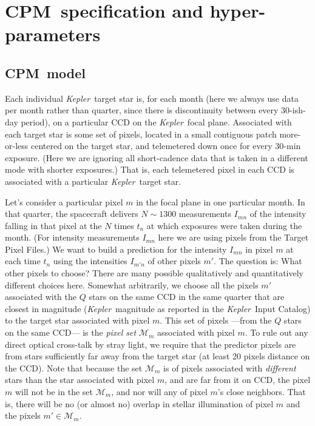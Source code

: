 \documentclass[12pt, preprint]{aastex}
\newcommand{\project}[1]{\textsl{#1}}
\newcommand{\Kepler}{\project{Kepler}}
\newcommand{\name}{CPM}
\newcommand{\set}[1]{\mathcal{#1}}
\begin{document}
\section{\name\ specification and hyper-parameters}
\subsection{\name\ model}
Each individual \Kepler\ target star is, for each month (here we always use data per month rather than quarter,  
since there is discontinuity between every 30-ish-day period),
  on a particular CCD on the \Kepler\ focal plane.
Associated with each target star is some set of pixels,
  located in a small contiguous patch more-or-less centered on the target star,
  and telemetered down once for every 30-min exposure.
(Here we are ignoring all short-cadence data that is taken in a different mode with shorter exposures.)
That is, each telemetered pixel in each CCD is associated with a particular \Kepler\ target star.

Let's consider a particular pixel $m$ in the focal plane in one particular month.
In that quarter, the spacecraft delivers $N\sim 1300$ measurements $I_{mn}$
  of the intensity falling in that pixel at the $N$ times $t_n$ at which exposures were taken during the month.
(For intensity measurements $I_{mn}$ here we are using pixels from the Target Pixel Files.)
We want to build a prediction for the intensity $I_{mn}$ in pixel $m$ at each time $t_n$
  using the intensities $I_{m'n}$ of other pixels $m'$.
The question is:  What other pixels to choose?
There are many possible qualitatively and quantitatively different choices here.
Somewhat arbitrarily,
  we choose all the pixels $m'$ associated with the $Q$ stars on the same CCD in the same quarter
  that are closest in magnitude
  (\Kepler\ magnitude as reported in the \Kepler\ Input Catalog)
  to the target star associated with pixel $m$.
This set of pixels%
  ---from the $Q$ stars on the same CCD---%
  is the \emph{pixel set} $\set{M}_m$ associated with pixel $m$.
   To rule out any direct optical cross-talk by stray
light, we require that the predictor pixels are from stars
sufficiently far away from the target star (at least 20 pixels
distance on the CCD).
Note that because the set $\set{M}_m$ is of pixels associated with \emph{different} stars
  than the star associated with pixel $m$, and are far from it on CCD, 
  the pixel $m$ will not be in the set $\set{M}_m$,
  and nor will any of pixel $m$'s close neighbors.
That is, there will be no (or almost no) overlap in stellar illumination of pixel $m$
  and the pixels $m'\in\set{M}_m$.
\end{document}
